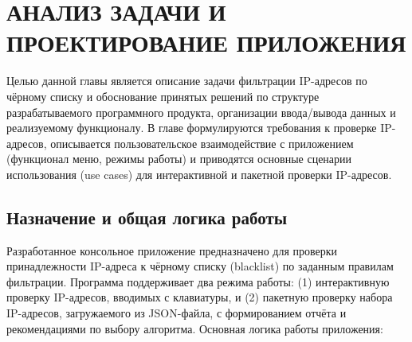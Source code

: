 \chapter{АНАЛИЗ ЗАДАЧИ И ПРОЕКТИРОВАНИЕ ПРИЛОЖЕНИЯ} \label{ch1}



Целью данной главы является описание задачи фильтрации IP-адресов по чёрному списку и обоснование принятых решений по структуре разрабатываемого программного продукта, организации ввода/вывода данных и реализуемому функционалу. В главе формулируются требования к проверке IP-адресов, описывается пользовательское взаимодействие с приложением (функционал меню, режимы работы) и приводятся основные сценарии использования (use cases) для интерактивной и пакетной проверки IP-адресов.

\section{Назначение и общая логика работы} \label{ch1:sec1}

Разработанное консольное приложение предназначено для проверки принадлежности IP-адреса к чёрному списку (blacklist) по заданным правилам фильтрации. Программа поддерживает два режима работы: (1) интерактивную проверку IP-адресов, вводимых с клавиатуры, и (2) пакетную проверку набора IP-адресов, загружаемого из JSON-файла, с формированием отчёта и рекомендациями по выбору алгоритма.
Основная логика работы приложения:

